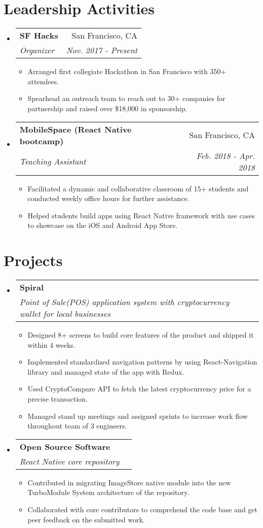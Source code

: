 \documentclass[letterpaper, 10pt]{article}
\makeatletter
\newcommand{\resumeItem}[2]{
  \item\small{
    \textbf{#1}{#2 \vspace{-2pt}}
  }
}
\newcommand{\resumeSubheading}[4]{
  \vspace{-1pt}\item
    \begin{tabular*}{0.97\textwidth}{l@{\extracolsep{\fill}}r}
      \textbf{#1} & #2 \\
      \textit{\small#3} & \textit{\small #4} \\
    \end{tabular*}\vspace{-5pt}
}
\newcommand{\resumeSubHeadingListStart}{\begin{itemize}[leftmargin=*]}
\newcommand{\resumeSubHeadingListEnd}{\end{itemize}}
\newcommand{\resumeItemListStart}{\begin{itemize}}
\newcommand{\resumeItemListEnd}{\end{itemize}\vspace{-5pt}}
\makeatother
\begin{document}
\section{Leadership Activities}
  \resumeSubHeadingListStart

    \resumeSubheading
      {SF Hacks}{San Francisco, CA}
      {Organizer}{Nov. 2017 - Present}
      \resumeItemListStart
        \resumeItem{}
          {Arranged first collegiate Hackathon in San Francisco with 350+ attendees.}
        \resumeItem{}
          {Spearhead an outreach team to reach out to 30+ companies for partnership and raised over \$18,000 in sponsorship.}
      \resumeItemListEnd
      
      \resumeSubheading
      {MobileSpace (React Native bootcamp)}{San Francisco, CA}
      {Teaching Assistant}{Feb. 2018 - Apr. 2018}
      \resumeItemListStart
        \resumeItem{}
          {Facilitated a dynamic and collaborative classroom of 15+ students and conducted weekly office hours for further assistance.}
        \resumeItem{}
          {Helped students build apps using React Native framework with use cases to showcase on the iOS and Android App Store.}
      \resumeItemListEnd

   \resumeSubHeadingListEnd
   
\section{Projects}
  \resumeSubHeadingListStart
  
    \resumeSubheading
      {Spiral}{}
      {Point of Sale(POS) application system with cryptocurrency wallet for local businesses}{}
      \resumeItemListStart
        \resumeItem{}
          {Designed 8+ screens to build core features of the product and shipped it within 4 weeks.}
        \resumeItem{}
          {Implemented standardized navigation patterns by using React-Navigation library and managed state of the app with Redux.}
        \resumeItem{}
          {Used CryptoCompare API to fetch the latest cryptocurrency price for a precise transaction.}
        \resumeItem{}
          {Managed stand up meetings and assigned sprints to increase work flow throughout team of 3 engineers.}
      \resumeItemListEnd
    
      
      
     \resumeSubheading
      {Open Source Software}{}
      {React Native core repository}{}
      \resumeItemListStart
        \resumeItem{}
          {Contributed in migrating ImageStore native module into the new TurboModule System architecture of the repository.}
      \resumeItem{}
          {Collaborated with core contributors to comprehend the code base and get peer feedback on the submitted work.}
      \resumeItemListEnd
  \resumeSubHeadingListEnd
\end{document}
